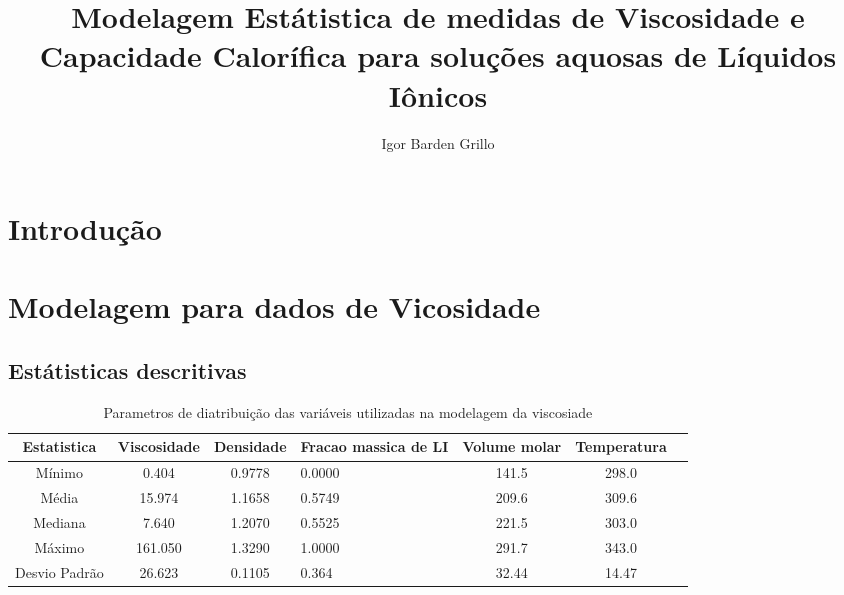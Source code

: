 \documentclass[a4paper,12pt]{article}
\author{Igor Barden Grillo   \\}
\title{Modelagem Estátistica de medidas de Viscosidade e Capacidade Calorífica para soluções aquosas de Líquidos Iônicos}
\begin{document}
\date{}
\maketitle
\frenchspacing

\newpage

\section{Introdução}

\section{Modelagem para dados de Vicosidade}

\subsection{Estátisticas descritivas}

\begin{table}[htp]\centering
\begin{tabular}{|c|c|c|p{2.5cm}|c|c|c|}
 \hline
Estatistica & Viscosidade & Densidade  & Fracao massica de LI & Volume  molar &  Temperatura \\ \hline   
Mínimo   & 0.404 & 0.9778 & 0.0000 & 141.5 & 298.0 \\ \hline                                                                                                                                                    
Média  & 15.974 & 1.1658 & 0.5749 & 209.6 & 309.6   \\ \hline      
Mediana &  7.640 & 1.2070 & 0.5525 & 221.5 & 303.0  \\ \hline      
Máximo & 161.050  & 1.3290 & 1.0000 & 291.7 & 343.0 \\ \hline      
Desvio Padrão & 26.623 & 0.1105 &  0.364 & 32.44 & 14.47  \\ \hline      

\end{tabular}
\caption{Parametros de diatribuição das variáveis utilizadas na modelagem da viscosiade}
\end{table}
\end{document}
